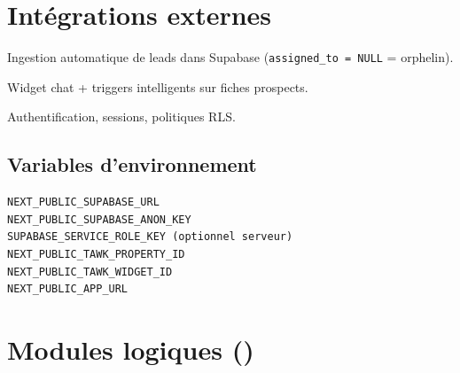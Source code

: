 \documentclass[11pt,a4paper]{report}
\begin{document}
\chapter{Intégrations externes}

\begin{description}[style=nextline]
  \item[n8n] Ingestion automatique de leads dans Supabase (\texttt{assigned\_to = NULL} = orphelin).
  \item[Tawk.to] Widget chat + triggers intelligents sur fiches prospects.
  \item[Supabase Auth] Authentification, sessions, politiques RLS.
\end{description}

\section{Variables d'environnement}

\begin{lstlisting}
NEXT_PUBLIC_SUPABASE_URL
NEXT_PUBLIC_SUPABASE_ANON_KEY
SUPABASE_SERVICE_ROLE_KEY (optionnel serveur)
NEXT_PUBLIC_TAWK_PROPERTY_ID
NEXT_PUBLIC_TAWK_WIDGET_ID
NEXT_PUBLIC_APP_URL
\end{lstlisting}

\chapter{Modules logiques ()}
\end{document}
